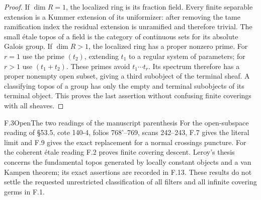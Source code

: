 \begin{proof}
If $\dim R=1$, the localized ring is its fraction field. Every finite
separable extension is a Kummer extension of its uniformizer: after
removing the tame ramification index the residual extension is unramified
and therefore trivial. The small \'etale topos of a field is the category
of continuous sets for its absolute Galois group. If $\dim R>1$, the
localized ring has a proper nonzero prime. For $r=1$ use the prime
$(t_2)$, extending $t_1$ to a regular system of parameters; for $r>1$ use
$(t_1+t_2)$. These primes avoid $t_1\cdots t_r$. Its spectrum therefore
has a proper nonempty open subset, giving a third subobject of the
terminal sheaf. A classifying topos of a group has only the empty and
terminal subobjects of its terminal object. This proves the last
assertion without confusing finite coverings with all sheaves.
\end{proof}

\begin{statement}{F.3}{Open}{The two readings of the manuscript parenthesis}
For the open-subspace reading of \S53.5, cote 140-4, folios 768'--769,
scans 242--243, F.7 gives the literal limit and F.9 gives the exact
replacement for a normal crossings puncture. For the coherent \'etale
reading F.2 proves finite covering descent. Leroy's thesis concerns the
fundamental topos generated by locally constant objects and a
van Kampen theorem; its exact assertions are recorded in F.13. These
results do not settle the requested unrestricted classification of all
filters and all infinite covering germs in F.1.
\end{statement}

